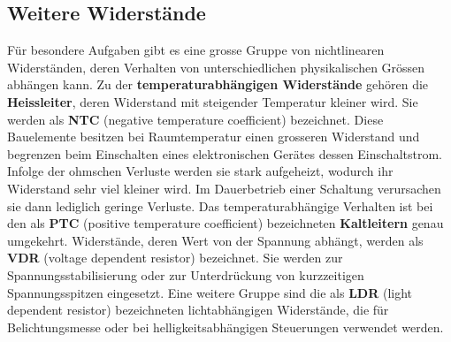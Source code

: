 \subsection{Weitere Widerstände}
Für besondere Aufgaben gibt es eine grosse Gruppe von nichtlinearen Widerständen, deren Verhalten von unterschiedlichen physikalischen Grössen abhängen kann.
\newline\newline
Zu der \textbf{temperaturabhängigen Widerstände} gehören die \textbf{Heissleiter}, deren Widerstand mit steigender Temperatur kleiner wird. Sie werden als \textbf{NTC} (negative temperature coefficient) bezeichnet. Diese Bauelemente besitzen bei Raumtemperatur einen grosseren Widerstand und begrenzen beim Einschalten eines elektronischen Gerätes dessen Einschaltstrom. Infolge der ohmschen Verluste werden sie stark aufgeheizt, wodurch ihr Widerstand sehr viel kleiner wird. Im Dauerbetrieb einer Schaltung verursachen sie dann lediglich geringe Verluste. Das temperaturabhängige Verhalten ist bei den als \textbf{PTC} (positive temperature coefficient) bezeichneten \textbf{Kaltleitern} genau umgekehrt.
\newline\newline
Widerstände, deren Wert von der Spannung abhängt, werden als \textbf{VDR} (voltage dependent resistor) bezeichnet. Sie werden zur Spannungsstabilisierung oder zur Unterdrückung von kurzzeitigen Spannungsspitzen eingesetzt.
\newline\newline
Eine weitere Gruppe sind die als \textbf{LDR} (light dependent resistor) bezeichneten lichtabhängigen Widerstände, die für Belichtungsmesse oder bei helligkeitsabhängigen Steuerungen verwendet werden.
